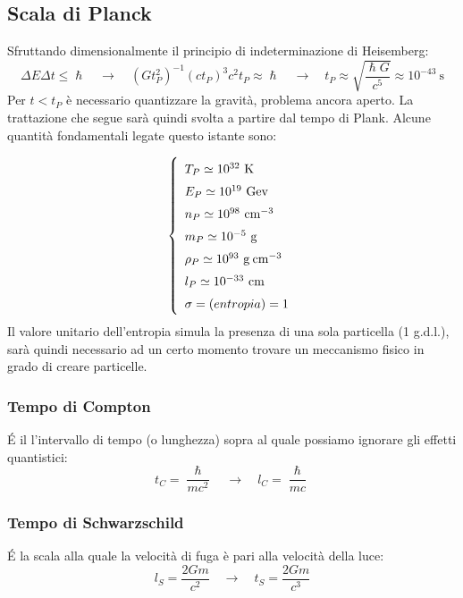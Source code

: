 \subsection{Scala di Planck}
Sfruttando dimensionalmente il principio di indeterminazione di Heisemberg:
$$
\Delta E \Delta t \leq \hslash \quad \rightarrow \quad (G t_P^2)^{-1} (c t_P)^{3}c^2 t_P \approx \hslash \quad \rightarrow \quad t_P \approx \sqrt{\frac{\hslash G}{c^5}} \approx 10^{-43}~\mathrm{s}
$$
Per $t<t_P$ è necessario quantizzare la gravità, problema ancora aperto. La trattazione che segue sarà quindi svolta a partire dal tempo di Plank. Alcune quantità fondamentali legate questo istante sono:

\begin{equation}\left\{
    \def\arraystretch{1.5}
        \begin{array}{ll}
        T_P \simeq 10^{32}~\mathrm{K} \\
        E_P \simeq 10^{19}~\mathrm{Gev} \\
        n_P \simeq 10^{98}~\mathrm{cm}^{-3} \\
        m_P \simeq 10^{-5}~\mathrm{g} \\
        \rho_P \simeq 10^{93}~\mathrm{g\: cm}^{-3}  \\
        l_P \simeq 10^{-33}~\mathrm{cm} \\
        \sigma = (entropia) = 1 
    \end{array}\right. \label{eq:unitaplanckiane}
\end{equation}
Il valore unitario dell'entropia simula la presenza di una sola particella (1 g.d.l.), sarà quindi necessario ad un certo momento trovare un meccanismo fisico in grado di creare particelle.  

\subsubsection{Tempo di Compton}
É il l'intervallo di tempo (o lunghezza) sopra al quale possiamo ignorare gli effetti quantistici:
\begin{equation}
    t_C = \frac{\hslash}{mc^2} \quad \rightarrow \quad l_C =  \frac{\hslash}{mc}
\end{equation}

\subsubsection{Tempo di Schwarzschild}
É la scala alla quale la velocità di fuga è pari alla velocità della luce:
\begin{equation}
    l_S =  \frac{2Gm}{c^2}  \quad \rightarrow \quad   t_S = \frac{2Gm}{c^3} 
\end{equation}


